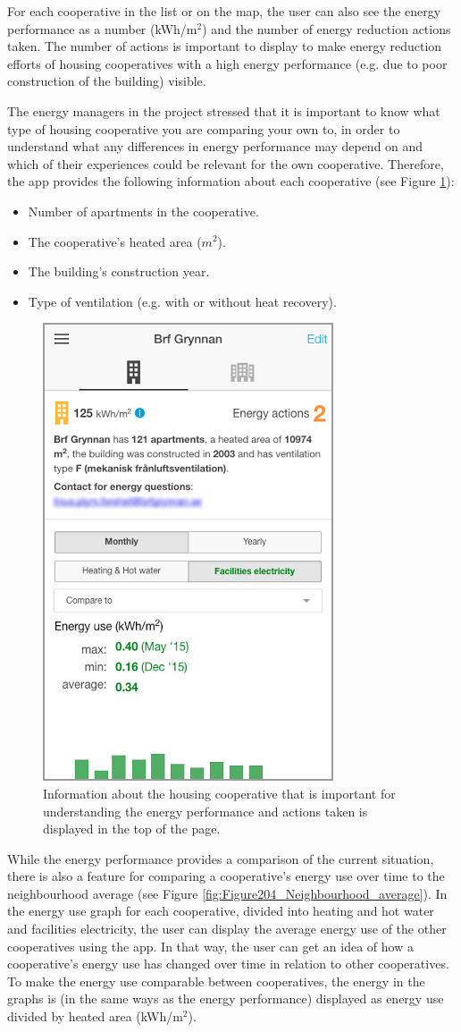 For each cooperative in the list or on the map, the user can also see the energy performance as a number (kWh/m$^2$) and the number of energy reduction actions taken. The number of actions is important to display to make energy reduction efforts of housing cooperatives with a high energy performance (e.g. due to poor construction of the building) visible. 

The energy managers in the project stressed that it is important to know what type of housing cooperative you are comparing your own to, in order to understand what any differences in energy performance may depend on and which of their experiences could be relevant for the own cooperative. Therefore, the app provides the following information about each cooperative (see Figure \ref{fig:Figure203_cooperative_info}):
\begin{itemize}
\item Number of apartments in the cooperative.
\item The cooperative's heated area ($m^2$).
\item The building's construction year.
\item Type of ventilation (e.g. with or without heat recovery).
\end{itemize}

\begin{figure}
	\centering
	\includegraphics[width=0.4\linewidth]{img/Figure203_cooperative_info.png}
	\caption{Information about the housing cooperative that is important for understanding the energy performance and actions taken is displayed in the top of the page.}
	\label{fig:Figure203_cooperative_info}
\end{figure}

While the energy performance provides a comparison of the current situation, there is also a feature for comparing a cooperative's energy use over time to the neighbourhood average (see Figure \ref{fig:Figure204_Neighbourhood_average}). In the energy use graph for each cooperative, divided into heating and hot water and facilities electricity, the user can display the average energy use of the other cooperatives using the app. In that way, the user can get an idea of how a cooperative's energy use has changed over time in relation to other cooperatives. To make the energy use comparable between cooperatives, the energy in the graphs is (in the same ways as the energy performance) displayed as energy use divided by heated area (kWh/m$^2$).


